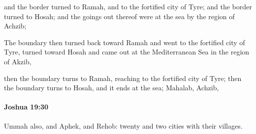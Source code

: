 			\begin{versebox}
					\item[BHS] 
					\item[ASV] and the border turned to Ramah, and to the fortified city of Tyre; and the border turned to Hosah; and the goings out thereof were at the sea by the region of Achzib;
					\item[NIV] The boundary then turned back toward Ramah and went to the fortified city of Tyre, turned toward Hosah and came out at the Mediterranean Sea in the region of Akzib,
					\item[NRSV] then the boundary turns to Ramah, reaching to the fortified city of Tyre; then the boundary turns to Hosah, and it ends at the sea; Mahalab, Achzib,
			\end{versebox}

		\paragraph{Joshua 19:30} %
			\label{JOSHUA-19-30}

			Ummah also, and Aphek, and Rehob: twenty and two cities with their villages.

